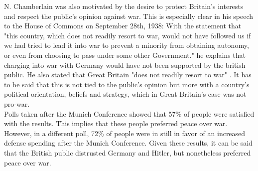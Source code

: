 \documentclass[10pt, a4papert, hidelinks]{article}
\begin{document}

N. Chamberlain was also motivated by the desire to protect Britain's interests and respect the public's opinion against war. This is especially clear in his speech to the House of Commons on September 28th, 1938: With the statement that "this country, which does not readily resort to war, would not have followed us if we had tried to lead it into war to prevent a  minority from obtaining autonomy, or even from choosing to pass under some other Government." \cite{prime_minister_statement_common_sittings_european_situation} he explains that charging into war with Germany would have not been supported by the british public. He also stated that Great Britain "does not readily resort to war" \cite{chamberlain_neville_2000}. It has to be said that this is not tied to the public's opinion but more with a country's political orientation, beliefs and strategy, which in Great Britain's case was not pro-war.\\
Polls taken after the Munich Conference showed that 57\% of people were satisfied with the results. This implies that these people preferred peace over war. However, in a different poll, 72\% of people were in still in favor of an increased defense spending after the Munich Conference. Given these results, it can be said that the British public distrusted Germany and Hitler, but nonetheless preferred peace over war.
\end{document}
